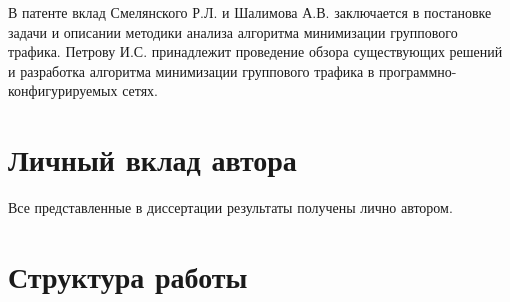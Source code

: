 \documentclass[../thesis.tex]{subfiles}
\begin{document}
В патенте \cite{petrov2018patent} вклад Смелянского Р.Л. и Шалимова А.В. заключается в постановке задачи и описании методики анализа алгоритма минимизации группового трафика.
Петрову И.С. принадлежит проведение обзора существующих решений и разработка алгоритма минимизации группового трафика в программно-конфигурируемых сетях.

\section*{Личный вклад автора}

Все представленные в диссертации результаты получены лично автором.

\section*{Структура работы}
\end{document}
